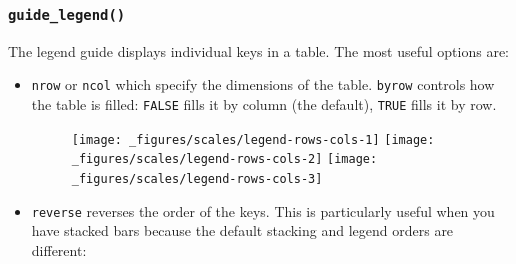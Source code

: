 \subsubsection{\texorpdfstring{\texttt{guide\_legend()}}{guide\_legend()}}\label{guideux5flegend}

The legend guide displays individual keys in a table. The most useful
options are: 

\begin{itemize}
\item
  \texttt{nrow} or \texttt{ncol} which specify the dimensions of the
  table. \texttt{byrow} controls how the table is filled: \texttt{FALSE}
  fills it by column (the default), \texttt{TRUE} fills it by row.

\begin{Shaded}
\begin{Highlighting}[]
\StringTok{ }\NormalTok{(} \NormalTok{, } \NormalTok{:}\NormalTok{, } \NormalTok{letters[}\NormalTok{:}\NormalTok{])}
\StringTok{ }\StringTok{ }\NormalTok{(}\NormalTok{(} 
\StringTok{ }\NormalTok{(} \NormalTok{(} \NormalTok{))}
\StringTok{ }\NormalTok{(} \NormalTok{(} \NormalTok{, } \NormalTok{))}
\end{Highlighting}
\end{Shaded}

  \begin{figure}[H]
    \texttt{[image: \_figures/scales/legend-rows-cols-1]}%
    \texttt{[image: \_figures/scales/legend-rows-cols-2]}%
    \texttt{[image: \_figures/scales/legend-rows-cols-3]}
  \end{figure}
\item
  \texttt{reverse} reverses the order of the keys. This is particularly
  useful when you have stacked bars because the default stacking and
  legend orders are different:

\begin{Shaded}
\begin{Highlighting}[]
\StringTok{ }\NormalTok{(}\StringTok{ }\NormalTok{(} \NormalTok{, }\NormalTok{(} 
\StringTok{ }\NormalTok{(} \NormalTok{(} \NormalTok{))}
\end{Highlighting}
\end{Shaded}


\end{itemize}
